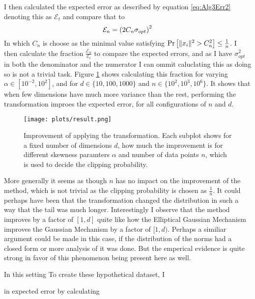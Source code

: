 \documentclass[a4paper,12pt]{article}
\begin{document}
I then calculated the expected error as described by equation 
\eqref{eq:Alg3Err2} denoting this as $\mathcal{E}_t$ and compare that to
\[
    \mathcal{E}_n = \left (2C_n\sigma_{opt}\right)^2
\]
In which $C_n$ is choose as the minimal value satisfying 
$\Pr\left [ \|x_i\|^2 > C_n^2 \right] \le \frac{1}{n}$. 
I then calculate the fraction $\frac{\mathcal{E}_n}{\mathcal{E}_t}$ to compare 
the expected errors, and as I have $\sigma_{opt}^2$ in both the denominator and the numerator I 
can ommit caluclating this as doing so is not a trivial task. 
Figure \ref{fig:result} shows calculating this fraction for varying $\alpha \in [10^{-2}, 10^2]$, and for 
$d \in \{10, 100, 1000\}$ and $n \in \{10^2, 10^3, 10^6\}$.
It shows that when few dimensions have much more variance than the rest,
performing the transformation improes the expected error, for all 
configurations of $n$ and $d$.
\begin{figure}[h!]
\label{fig:result}
\texttt{[image: plots/result.png]}
\caption{Improvement of applying the transformation. 
Each subplot shows for a fixed number of dimensions $d$, how much the improvement is for different 
skewness paramters $\alpha$ and number of data points $n$,
 which is used to decide the clipping probability.}
\end{figure}



More generally it seems as though $n$ has no impact on the improvement of the method, 
which is not trivial as the clipping probability is chosen as $\frac{1}{n}$. 
It could perhaps have been that the transformation changed the distribution in such a way
that the tail was much longer.
Interestingly I observe that the method improves by a factor of $[1,d]$ 
quite like how the Elliptical Gaussian Mechanism improves the Gaussian Mechanism by a 
factor of $[1,d)$. Perhaps a similiar argument could be made in this case, 
if the distribution of the norms had a closed form or more analysis of it was done.
But the emperical evidence is quite strong in favor of this phenomenon being present here as well.




In this setting To create these hypothetical dataset, I 


in expected error by calculating 
\end{document}
